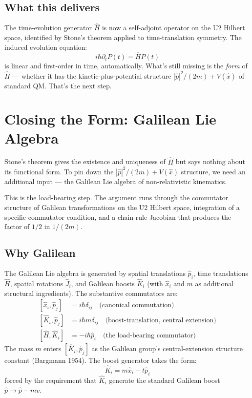 \documentclass[11pt,a4paper]{article}
\begin{document}
\subsection{What this delivers}

The time-evolution generator $\hat{H}$ is now a self-adjoint operator on the U2 Hilbert space, identified by Stone's theorem applied to time-translation symmetry. The induced evolution equation:
\[
i\hbar \partial_t P(t) = \hat{H} P(t)
\]
is linear and first-order in time, automatically. What's still missing is the \emph{form} of $\hat{H}$ --- whether it has the kinetic-plus-potential structure $|\hat{p}|^{2}/(2m) + V(\hat{x})$ of standard QM. That's the next step.

\section{Closing the Form: Galilean Lie Algebra}

Stone's theorem gives the existence and uniqueness of $\hat{H}$ but says nothing about its functional form. To pin down the $|\hat{p}|^{2}/(2m) + V(\hat{x})$ structure, we need an additional input --- the Galilean Lie algebra of non-relativistic kinematics.

This is the load-bearing step. The argument runs through the commutator structure of Galilean transformations on the U2 Hilbert space, integration of a specific commutator condition, and a chain-rule Jacobian that produces the factor of $1/2$ in $1/(2m)$.

\subsection{Why Galilean}

The Galilean Lie algebra is generated by spatial translations $\hat{p}_i$, time translations $\hat{H}$, spatial rotations $\hat{J}_i$, and Galilean boosts $\hat{K}_i$ (with $\hat{x}_i$ and $m$ as additional structural ingredients). The substantive commutators are:
\[
\begin{aligned}
[\hat{x}_i, \hat{p}_j] &= i\hbar \delta_{ij} \quad \text{(canonical commutation)} \\
[\hat{K}_i, \hat{p}_j] &= i\hbar m \delta_{ij} \quad \text{(boost-translation, central extension)} \\
[\hat{H}, \hat{K}_i] &= -i\hbar \hat{p}_i \quad \text{(the load-bearing commutator)}
\end{aligned}
\]
The mass $m$ enters $[\hat{K}_i, \hat{p}_j]$ as the Galilean group's central-extension structure constant (Bargmann 1954). The boost generator takes the form:
\[
\hat{K}_i = m \hat{x}_i - t \hat{p}_i
\]
forced by the requirement that $\hat{K}_i$ generate the standard Galilean boost $\hat{p} \to \hat{p} - mv$.
\end{document}
